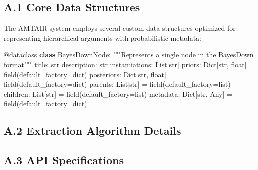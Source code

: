 \documentclass[
  11pt,
  letterpaper,
]{book}
\newenvironment{Shaded}{\begin{snugshade}}{\end{snugshade}}
\newcommand{\AttributeTok}[1]{\textcolor[rgb]{0.40,0.45,0.13}{#1}}
\newcommand{\BuiltInTok}[1]{\textcolor[rgb]{0.00,0.23,0.31}{#1}}
\newcommand{\CommentTok}[1]{\textcolor[rgb]{0.37,0.37,0.37}{#1}}
\newcommand{\KeywordTok}[1]{\textcolor[rgb]{0.00,0.23,0.31}{\textbf{#1}}}
\newcommand{\NormalTok}[1]{\textcolor[rgb]{0.00,0.23,0.31}{#1}}
\newcommand{\OperatorTok}[1]{\textcolor[rgb]{0.37,0.37,0.37}{#1}}
\begin{document}

\subsection*{A.1 Core Data Structures}\label{sec-data-structures}

The AMTAIR system employs several custom data structures optimized for
representing hierarchical arguments with probabilistic metadata:

\begin{Shaded}
\begin{Highlighting}[]
\AttributeTok{@dataclass}
\KeywordTok{class}\NormalTok{ BayesDownNode:}
    \CommentTok{"""Represents a single node in the BayesDown format"""}
\NormalTok{    title: }\BuiltInTok{str}
\NormalTok{    description: }\BuiltInTok{str}
\NormalTok{    instantiations: List[}\BuiltInTok{str}\NormalTok{]}
\NormalTok{    priors: Dict[}\BuiltInTok{str}\NormalTok{, }\BuiltInTok{float}\NormalTok{] }\OperatorTok{=}\NormalTok{ field(default\_factory}\OperatorTok{=}\BuiltInTok{dict}\NormalTok{)}
\NormalTok{    posteriors: Dict[}\BuiltInTok{str}\NormalTok{, }\BuiltInTok{float}\NormalTok{] }\OperatorTok{=}\NormalTok{ field(default\_factory}\OperatorTok{=}\BuiltInTok{dict}\NormalTok{)}
\NormalTok{    parents: List[}\BuiltInTok{str}\NormalTok{] }\OperatorTok{=}\NormalTok{ field(default\_factory}\OperatorTok{=}\BuiltInTok{list}\NormalTok{)}
\NormalTok{    children: List[}\BuiltInTok{str}\NormalTok{] }\OperatorTok{=}\NormalTok{ field(default\_factory}\OperatorTok{=}\BuiltInTok{list}\NormalTok{)}
\NormalTok{    metadata: Dict[}\BuiltInTok{str}\NormalTok{, Any] }\OperatorTok{=}\NormalTok{ field(default\_factory}\OperatorTok{=}\BuiltInTok{dict}\NormalTok{)}
\end{Highlighting}
\end{Shaded}

\subsection*{A.2 Extraction Algorithm
Details}\label{sec-extraction-details}

\subsection*{A.3 API Specifications}\label{sec-api-specs}
\end{document}
